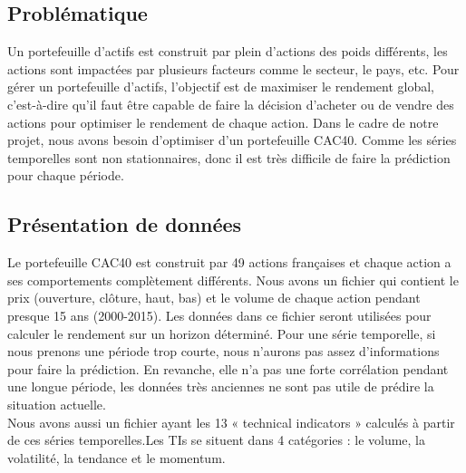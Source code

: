 \subsection{Problématique}

Un portefeuille d'actifs est construit par plein d'actions des poids différents, les actions sont impactées par plusieurs facteurs comme le secteur, le pays, etc. Pour gérer un portefeuille d'actifs, l'objectif est de maximiser le rendement global, c'est-à-dire qu'il faut être capable de faire la décision d'acheter ou de vendre des actions pour optimiser le rendement de chaque action. Dans le cadre de notre projet, nous avons besoin d’optimiser d'un portefeuille CAC40. Comme les séries temporelles sont non stationnaires, donc il est très difficile de faire la prédiction pour chaque période.

\subsection{Présentation de données}

Le portefeuille CAC40 est construit par 49 actions françaises et chaque action a ses comportements complètement différents. Nous avons un fichier qui contient le prix (ouverture, clôture, haut, bas) et le volume de chaque action pendant presque 15 ans (2000-2015). Les données dans ce fichier seront utilisées pour calculer le rendement sur un horizon déterminé. Pour une série temporelle, si nous prenons une période trop courte, nous n'aurons pas assez d'informations pour faire la prédiction. En revanche, elle n'a pas une forte corrélation pendant une longue période, les données très anciennes ne sont pas utile de prédire la situation actuelle.\\

Nous avons aussi un fichier ayant les 13 « technical indicators » calculés à partir de ces séries temporelles.Les TIs se situent dans 4 catégories : le volume, la volatilité, la tendance et le momentum.
